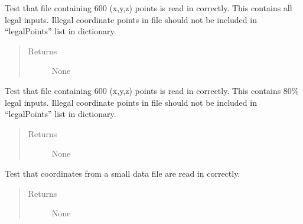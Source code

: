 \documentclass[letterpaper,10pt,english]{sphinxmanual}
\begin{document}
\begin{fulllineitems}
\begin{fulllineitems}
\label{\detokenize{index:src.Tests.Graph_Test.Graph_Test.test_readCoordinates_size600_allLegal}}
Test that file containing 600 (x,y,z) points is read in correctly. This contains all legal inputs.
Illegal coordinate points in file should not be included in “legalPoints” list in dictionary.
\begin{quote}\begin{description}
\item[{Returns}] \leavevmode
None

\end{description}\end{quote}

\end{fulllineitems}


\begin{fulllineitems}
\label{\detokenize{index:src.Tests.Graph_Test.Graph_Test.test_readCoordinates_size600_someLegal}}
Test that file containing 600 (x,y,z) points is read in correctly. This contains 80\% legal inputs.
Illegal coordinate points in file should not be included in “legalPoints” list in dictionary.
\begin{quote}\begin{description}
\item[{Returns}] \leavevmode
None

\end{description}\end{quote}

\end{fulllineitems}


\begin{fulllineitems}
\label{\detokenize{index:src.Tests.Graph_Test.Graph_Test.test_readCoordinates_small_illegal}}
Test that coordinates from a small data file are read in correctly.
\begin{quote}\begin{description}
\item[{Returns}] \leavevmode
None


\end{description}
\end{quote}
\end{fulllineitems}
\end{fulllineitems}
\end{document}
